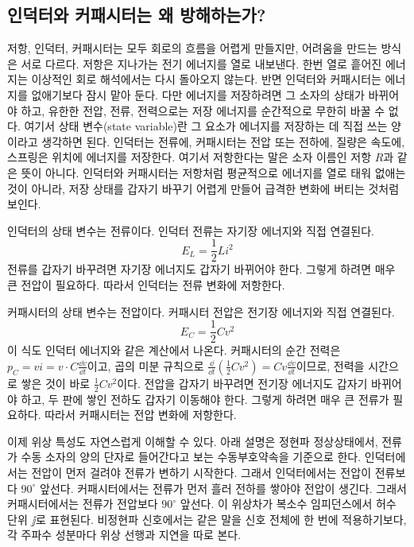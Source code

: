 \subsection{인덕터와 커패시터는 왜 방해하는가?}

저항, 인덕터, 커패시터는 모두 회로의 흐름을 어렵게 만들지만, 어려움을 만드는 방식은 서로 다르다.
저항은 지나가는 전기 에너지를 열로 내보낸다.
한번 열로 흩어진 에너지는 이상적인 회로 해석에서는 다시 돌아오지 않는다.
반면 인덕터와 커패시터는 에너지를 없애기보다 잠시 맡아 둔다.
다만 에너지를 저장하려면 그 소자의 상태가 바뀌어야 하고, 유한한 전압, 전류, 전력으로는 저장 에너지를 순간적으로 무한히 바꿀 수 없다.
여기서 상태 변수(state variable)란 그 요소가 에너지를 저장하는 데 직접 쓰는 양이라고 생각하면 된다.
인덕터는 전류에, 커패시터는 전압 또는 전하에, 질량은 속도에, 스프링은 위치에 에너지를 저장한다.
여기서 저항한다는 말은 소자 이름인 저항 $R$과 같은 뜻이 아니다.
인덕터와 커패시터는 저항처럼 평균적으로 에너지를 열로 태워 없애는 것이 아니라, 저장 상태를 갑자기 바꾸기 어렵게 만들어 급격한 변화에 버티는 것처럼 보인다.

인덕터의 상태 변수는 전류이다.
인덕터 전류는 자기장 에너지와 직접 연결된다.
\begin{equation}
  E_L=\frac{1}{2}Li^2
\end{equation}
전류를 갑자기 바꾸려면 자기장 에너지도 갑자기 바뀌어야 한다.
그렇게 하려면 매우 큰 전압이 필요하다.
따라서 인덕터는 전류 변화에 저항한다.

커패시터의 상태 변수는 전압이다.
커패시터 전압은 전기장 에너지와 직접 연결된다.
\begin{equation}
  E_C=\frac{1}{2}Cv^2
\end{equation}
이 식도 인덕터 에너지와 같은 계산에서 나온다.
커패시터의 순간 전력은 $p_C=vi=v\cdot C\frac{\dd v}{\dd t}$이고, 곱의 미분 규칙으로 $\frac{\dd}{\dd t}\left(\frac{1}{2}Cv^2\right)=Cv\frac{\dd v}{\dd t}$이므로, 전력을 시간으로 쌓은 것이 바로 $\frac{1}{2}Cv^2$이다.
%
전압을 갑자기 바꾸려면 전기장 에너지도 갑자기 바뀌어야 하고, 두 판에 쌓인 전하도 갑자기 이동해야 한다.
그렇게 하려면 매우 큰 전류가 필요하다.
따라서 커패시터는 전압 변화에 저항한다.

이제 위상 특성도 자연스럽게 이해할 수 있다.
아래 설명은 정현파 정상상태에서, 전류가 수동 소자의 양의 단자로 들어간다고 보는 수동부호약속을 기준으로 한다.
인덕터에서는 전압이 먼저 걸려야 전류가 변하기 시작한다.
그래서 인덕터에서는 전압이 전류보다 $90^\circ$ 앞선다.
커패시터에서는 전류가 먼저 흘러 전하를 쌓아야 전압이 생긴다.
그래서 커패시터에서는 전류가 전압보다 $90^\circ$ 앞선다.
이 위상차가 복소수 임피던스에서 허수 단위 $\jj$로 표현된다.
비정현파 신호에서는 같은 말을 신호 전체에 한 번에 적용하기보다, 각 주파수 성분마다 위상 선행과 지연을 따로 본다.

